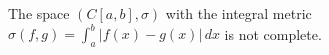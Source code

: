The space $(C[a,b], \sigma)$ with the integral metric $\sigma(f,g) = \int_a^b |f(x) - g(x)| \, dx$ is not complete.
